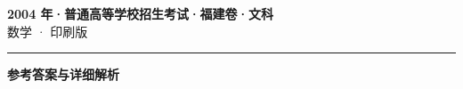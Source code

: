 \documentclass[zihao=5, a4paper]{ctexart}
\begin{document}
\begin{center}
  {\Large\bfseries 2004 年·普通高等学校招生考试·福建卷·文科}\\[4pt]
  {\large 数学 · 印刷版}
\end{center}
\medskip
{}

\par\bigskip\hrule\bigskip
{}
\begin{center}{\large\bfseries 参考答案与详细解析}\end{center}
\smallskip

\end{document}
